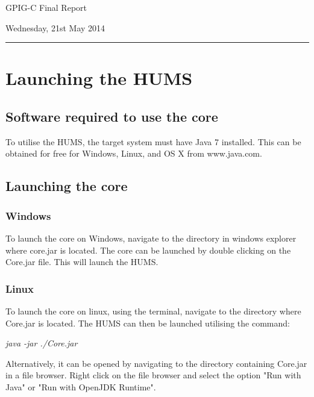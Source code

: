 \documentclass[10pt,a4paper]{article}
\begin{document}
\begin{center}
{\vspace*{-0.5cm}
\Huge GPIG-C Final Report}
\vspace*{0.2cm}

\vspace*{0.1cm}

Wednesday, 21st May 2014
\end{center}
\vspace*{0.4cm}
\hrule
\vspace*{0.4cm}

\section{Launching the HUMS}
\label{sec:launching}
\subsection{Software required to use the core}
To utilise the HUMS, the target system must have Java 7 installed. This can be obtained for free for Windows, Linux, and OS X from www.java.com.

\subsection{Launching the core}
\subsubsection{Windows}
To launch the core on Windows, navigate to the directory in windows explorer where core.jar is located. The core can be launched by double clicking on the Core.jar file. This will launch the HUMS.
\subsubsection{Linux}
To launch the core on linux, using the terminal, navigate to the directory where Core.jar is located. The HUMS can then be launched utilising the command:
\begin{center}
\textit{java -jar ./Core.jar}
\end{center}
Alternatively, it can be opened by navigating to the directory containing Core.jar in a file browser. Right click on the file browser and select the option "Run with Java" or "Run with OpenJDK Runtime".
\end{document}
